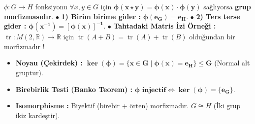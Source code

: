 \documentclass[11pt,a4paper]{article}
\begin{document}
\begin{tcolorbox}[colback=blue!5!white,colframe=blue!75!black,title=Grup Morfizması Tanımı ve Temel Özellikler]
$\phi : G \longrightarrow H$ fonksiyonu $\forall x, y \in G$ için $\mathbf{\phi(x \star y) = \phi(x) \cdot \phi(y)}$ sağlıyorsa \textbf{grup morfizmasıdır}.  
$\bullet$ \textbf{1) Birim birime gider :} $\mathbf{\phi(e_G) = e_H}$.  
$\bullet$ \textbf{2) Ters terse gider :} $\mathbf{\phi(x^{-1}) = [\phi(x)]^{-1}}$.  
$\bullet$ \textbf{Tahtadaki Matris İzi Örneği :} $\operatorname{tr} : M(2, \mathbb{R}) \to \mathbb{R}$ için $\operatorname{tr}(A+B) = \operatorname{tr}(A) + \operatorname{tr}(B)$ olduğundan bir morfizmadır !
\end{tcolorbox}

\begin{tcolorbox}[colback=purple!5!white,colframe=purple!75!black,title=Çekirdek ($\ker$), Görüntü ($\operatorname{im}$) ve Birebirlik]
\begin{itemize}
    \item \textbf{Noyau (Çekirdek) :} $\mathbf{\ker(\phi) = \{ x \in G \mid \phi(x) = e_H \} \leq G}$ (Normal alt gruptur).  
    \item \textbf{Birebirlik Testi (Banko Teorem) :} $\mathbf{\phi \text{ injectif} \iff \ker(\phi) = \{e_G\}}$.  
    \item \textbf{Isomorphisme :} Biyektif (birebir + örten) morfizmadır. $G \cong H$ (İki grup ikiz kardeştir).
\end{itemize}
\end{tcolorbox}
\end{document}

